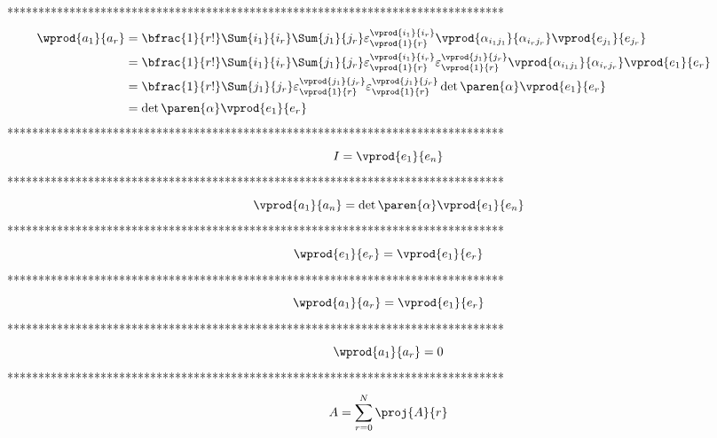 ********************************************************************************
\begin{align}
	\hspace{-24pt}\wprod{a_{1}}{a_{r}} & =
        \bfrac{1}{r!}\Sum{i_{1}}{i_{r}}\Sum{j_{1}}{j_{r}}\varepsilon^{\vprod{i_{1}}{i_{r}}}_{\vprod{1}{r}} 
	\vprod{\alpha_{i_{1}j_{1}}}{\alpha_{i_{r}j_{r}}}\vprod{e_{j_{1}}}{e_{j_{r}}}\label{EQ1_21} \\
	\hspace{-24pt} & =
	\bfrac{1}{r!}\Sum{i_{1}}{i_{r}}\Sum{j_{1}}{j_{r}}\varepsilon^{\vprod{i_{1}}{i_{r}}}_{\vprod{1}{r}}
	\varepsilon^{\vprod{j_{1}}{j_{r}}}_{\vprod{1}{r}}  
	\vprod{\alpha_{i_{1}j_{1}}}{\alpha_{i_{r}j_{r}}}\vprod{e_{1}}{e_{r}} \label{EQ1_22} \\
	\hspace{-24pt} & =
	\bfrac{1}{r!}\Sum{j_{1}}{j_{r}}\varepsilon^{\vprod{j_{1}}{j_{r}}}_{\vprod{1}{r}}
	\varepsilon^{\vprod{j_{1}}{j_{r}}}_{\vprod{1}{r}}  
	\det\paren{\alpha}\vprod{e_{1}}{e_{r}} \label{EQ1_23} \\
	\hspace{-24pt} & = \det\paren{\alpha}\vprod{e_{1}}{e_{r}} \label{EQ1_24}\
\end{align}
********************************************************************************
\begin{equation}\label{EQ1_25}
	I = \vprod{e_{1}}{e_{n}}
\end{equation}
********************************************************************************
\begin{equation}\label{EQ1_26}
	\vprod{a_{1}}{a_{n}} = \det\paren{\alpha}\vprod{e_{1}}{e_{n}}
\end{equation}
********************************************************************************
\begin{equation}\label{EQ1_27}
\wprod{e_{1}}{e_{r}} = \vprod{e_{1}}{e_{r}}
\end{equation}
********************************************************************************
\begin{equation}\label{EQ1_28}
\wprod{a_{1}}{a_{r}} = \vprod{e_{1}}{e_{r}}
\end{equation}
********************************************************************************
\begin{equation}\label{EQ1_29}
\wprod{a_{1}}{a_{r}} = 0
\end{equation}
********************************************************************************
\begin{equation}\label{EQ1_30}
A = \sum_{r=0}^{N}\proj{A}{r}
\end{equation}
